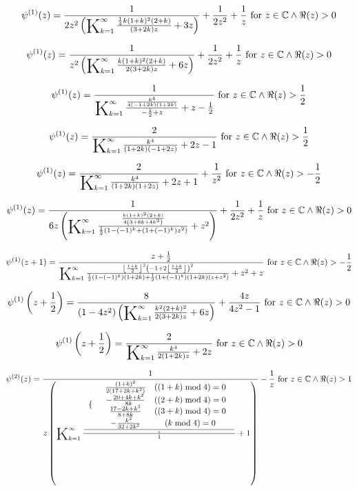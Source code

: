 \documentclass{article}
\newcommand{\bigK}{\mathop{\raisebox{-5pt}{\huge K}}}
\begin{document}
\[\psi ^{(1)}(z)=\frac{1}{2 z^2 \left(\bigK_{k=1}^{\infty}\frac{\frac{1}{4} k (1+k)^2 (2+k)}{(3+2 k) z}+3 z\right)}+\frac{1}{2 z^2}+\frac{1}{z}\text{ for }z\in \mathbb{C}\land \Re(z)>0\] 

\[\psi ^{(1)}(z)=\frac{1}{z^2 \left(\bigK_{k=1}^{\infty}\frac{k (1+k)^2 (2+k)}{2 (3+2 k) z}+6 z\right)}+\frac{1}{2 z^2}+\frac{1}{z}\text{ for }z\in \mathbb{C}\land \Re(z)>0\] 

\[\psi ^{(1)}(z)=\frac{1}{\bigK_{k=1}^{\infty}\frac{\frac{k^4}{4 (-1+2 k) (1+2 k)}}{-\frac{1}{2}+z}+z-\frac{1}{2}}\text{ for }z\in \mathbb{C}\land \Re(z)>\frac{1}{2}\] 

\[\psi ^{(1)}(z)=\frac{2}{\bigK_{k=1}^{\infty}\frac{k^4}{(1+2 k) (-1+2 z)}+2 z-1}\text{ for }z\in \mathbb{C}\land \Re(z)>\frac{1}{2}\] 

\[\psi ^{(1)}(z)=\frac{2}{\bigK_{k=1}^{\infty}\frac{k^4}{(1+2 k) (1+2 z)}+2 z+1}+\frac{1}{z^2}\text{ for }z\in \mathbb{C}\land \Re(z)>-\frac{1}{2}\] 

\[\psi ^{(1)}(z)=\frac{1}{6 z \left(\bigK_{k=1}^{\infty}\frac{\frac{k (1+k)^2 (2+k)}{4 \left(3+8 k+4 k^2\right)}}{\frac{1}{2} \left(1-(-1)^k+\left(1+(-1)^k\right) z^2\right)}+z^2\right)}+\frac{1}{2 z^2}+\frac{1}{z}\text{ for }z\in \mathbb{C}\land \Re(z)>0\] 

\[\psi ^{(1)}(z+1)=\frac{z+\frac{1}{2}}{\bigK_{k=1}^{\infty}\frac{\left\lfloor \frac{1+k}{2}\right\rfloor ^2 \left(-1+2 \left\lfloor \frac{1+k}{2}\right\rfloor \right)^2}{\frac{1}{2} \left(1-(-1)^k\right) (1+2 k)+\frac{1}{2} \left(1+(-1)^k\right) (1+2 k) \left(z+z^2\right)}+z^2+z}\text{ for }z\in \mathbb{C}\land \Re(z)>-\frac{1}{2}\] 

\[\psi ^{(1)}\left(z+\frac{1}{2}\right)=\frac{8}{\left(1-4 z^2\right) \left(\bigK_{k=1}^{\infty}\frac{k^2 (2+k)^2}{2 (3+2 k) z}+6 z\right)}+\frac{4 z}{4 z^2-1}\text{ for }z\in \mathbb{C}\land \Re(z)>0\] 

\[\psi ^{(1)}\left(z+\frac{1}{2}\right)=\frac{2}{\bigK_{k=1}^{\infty}\frac{k^4}{2 (1+2 k) z}+2 z}\text{ for }z\in \mathbb{C}\land \Re(z)>0\] 

\[\psi ^{(2)}(z)=\frac{1}{z \left(\bigK_{k=1}^{\infty}\frac{\frac{ \begin{array}{cc}  \{ &  \begin{array}{cc}  \frac{(1+k)^2}{2 \left(17+2 k+k^2\right)} & ((1+k) \bmod 4)=0 \\  -\frac{20+4 k+k^2}{8 k} & ((2+k) \bmod 4)=0 \\  \frac{17-2 k+k^2}{8+8 k} & ((3+k) \bmod 4)=0 \\  -\frac{k^2}{32+2 k^2} & (k \bmod 4)=0 \\ \end{array}  \\ \end{array} }{z}}{1}+1\right)}-\frac{1}{z}\text{ for }z\in \mathbb{C}\land \Re(z)>1\] 
\end{document}
